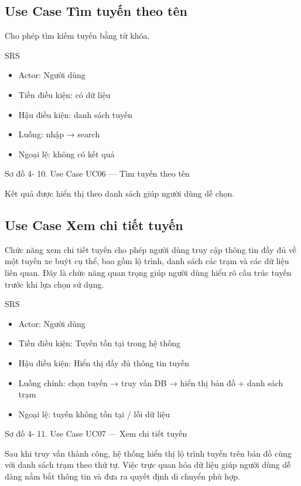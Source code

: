 \documentclass[13pt,a4paper]{report}
\begin{document}
\subsection{Use Case Tìm tuyến theo tên}

Cho phép tìm kiếm tuyến bằng từ khóa.

SRS

\begin{itemize}
    \item Actor: Người dùng
    \item Tiền điều kiện: có dữ liệu
    \item Hậu điều kiện: danh sách tuyến
    \item Luồng: nhập → search
    \item Ngoại lệ: không có kết quả
\end{itemize}

Sơ đồ 4- 10. Use Case UC06 — Tìm tuyến theo tên

Kết quả được hiển thị theo danh sách giúp người dùng dễ chọn.

\subsection{Use Case Xem chi tiết tuyến}

Chức năng xem chi tiết tuyến cho phép người dùng truy cập thông tin đầy đủ về một tuyến xe buýt cụ thể, bao gồm lộ trình, danh sách các trạm và các dữ liệu liên quan. Đây là chức năng quan trọng giúp người dùng hiểu rõ cấu trúc tuyến trước khi lựa chọn sử dụng.

SRS

\begin{itemize}
    \item Actor: Người dùng
    \item Tiền điều kiện: Tuyến tồn tại trong hệ thống
    \item Hậu điều kiện: Hiển thị đầy đủ thông tin tuyến
    \item Luồng chính: chọn tuyến → truy vấn DB → hiển thị bản đồ + danh sách trạm
    \item Ngoại lệ: tuyến không tồn tại / lỗi dữ liệu
\end{itemize}

Sơ đồ 4- 11. Use Case UC07 — Xem chi tiết tuyến

Sau khi truy vấn thành công, hệ thống hiển thị lộ trình tuyến trên bản đồ cùng với danh sách trạm theo thứ tự. Việc trực quan hóa dữ liệu giúp người dùng dễ dàng nắm bắt thông tin và đưa ra quyết định di chuyển phù hợp.
\end{document}
